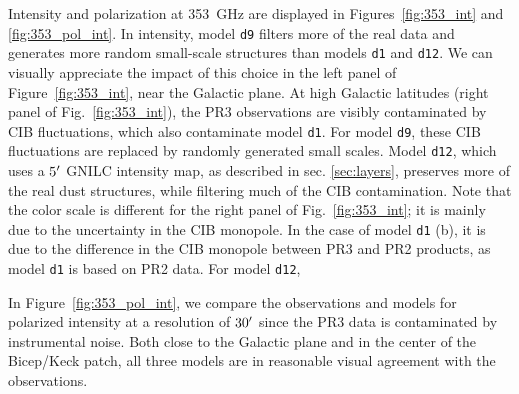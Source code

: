 \documentclass[twocolumn]{aastex631}
\begin{document}
Intensity and polarization at 353~GHz are displayed in Figures~\ref{fig:353_int} and \ref{fig:353_pol_int}. 
In intensity, model {\tt d9} filters more of the real data and generates more random small-scale structures than models {\tt d1} and {\tt d12}. We can visually appreciate the impact of this choice in the left panel of Figure~\ref{fig:353_int}, near the Galactic plane. At high Galactic latitudes (right panel of Fig.~\ref{fig:353_int}), the PR3 observations are visibly contaminated by CIB fluctuations, which also contaminate model {\tt d1}. For model {\tt d9}, these CIB fluctuations are replaced by randomly generated small scales. Model {\tt d12}, which uses a $5\mbox{$^\prime$}$ GNILC intensity map, as described in sec. \ref{sec:layers}, preserves more of the real dust structures, while filtering much of the CIB contamination.
Note that the color scale is different for the right panel of Fig.~\ref{fig:353_int}; it is mainly due to the uncertainty in the CIB monopole. In the case of model {\tt d1} (b), it is due to the difference in the CIB monopole between PR3 and PR2 products, as model {\tt d1} is based on PR2 data. For model {\tt d12}, 

In Figure~\ref{fig:353_pol_int}, we compare the observations and models for polarized intensity at a resolution of $30\mbox{$^\prime$}$ since the PR3 data is contaminated by instrumental noise. 
Both close to the Galactic plane and in the center of the Bicep/Keck patch, all three models are in reasonable visual agreement with the observations. 
\end{document}
